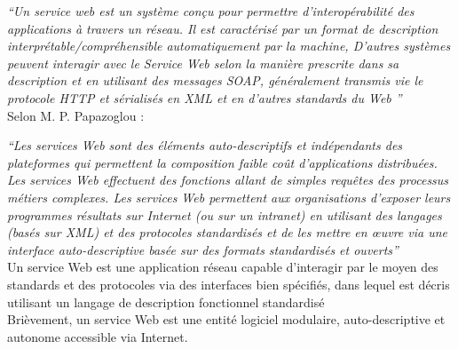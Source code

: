 	\emph{``Un service web est un système conçu pour permettre d'interopérabilité des applications à travers un réseau. 
	    Il est caractérisé par un format de description interprétable/compréhensible automatiquement par la machine,
	    D'autres systèmes peuvent interagir avec le Service Web selon la manière prescrite dans sa description et en
	    utilisant des messages SOAP, généralement transmis vie le protocole HTTP et sérialisés en XML et en d'autres 
	    standards du Web ''}\\

	Selon M. P. Papazoglou \cite{papazoglou2003service}: 

	\emph{``Les services Web sont des éléments auto-descriptifs et indépendants des plateformes qui permettent 
	    la composition faible coût d’applications distribuées.  Les services Web effectuent des fonctions allant 
	    de simples requêtes des processus métiers complexes. Les services Web permettent aux organisations d’exposer 
	    leurs programmes résultats sur Internet (ou sur un intranet) en utilisant des langages (basés sur XML)
	    et des protocoles standardisés et de les mettre en œuvre via une interface auto-descriptive basée sur 
	    des formats standardisés et ouverts''}\\

	Un service Web est une application réseau capable d'interagir par le moyen des standards et des protocoles 
	via des interfaces bien spécifiés, dans lequel est décris utilisant un langage de description fonctionnel
	standardisé \cite{curbera2001web}\\

	Brièvement, un service Web est une entité logiciel modulaire, auto-descriptive et autonome accessible 
	via Internet.


